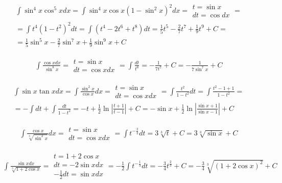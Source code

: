 
\begin{gather*}\int \sin^4 x \cos^5 x dx = \int \sin^4x \cos x(1-\sin^2 x)^2dx = \begin{array}{|l|} t=\sin x \\ dt=\cos dx \end{array} =  \\
= \int t^4(1-t^2)^2dt = \int (t^4-2t^6+t^8)dt = \frac{1}{5}t^5-\frac{2}{7}t^7+\frac{1}{9}t^9+C =  \\
= \frac{1}{5}\sin^5x-\frac{2}{7}\sin^7x+\frac{1}{9}\sin^9x+C\end{gather*}



\begin{gather*}\int \frac{\cos x dx}{\sin^8 x} = \begin{array}{|l|} t=\sin x \\ dt=\cos x dx \end{array} = \int \frac{dt}{t^8} = -\frac{1}{7t^7}+C = -\frac{1}{7\sin^7x}+C\end{gather*}



\begin{gather*}\int \sin x \tan x dx = \int \frac{\sin^2 x}{\cos x}dx = \begin{array}{|l|} t=\sin x \\ dt=\cos x dx \end{array} = \int \frac{t^2}{1-t^2}dt = \int \frac{t^2-1+1}{1-t^2} =  \\
= -\int dt + \int \frac{dt}{1-t^2} = -t + \frac{1}{2}\ln\left|\frac{t+1}{t-1}\right|+C = -\sin x + \frac{1}{2}\ln\left|\frac{\sin x+1}{\sin x-1}\right|+C\end{gather*}



\begin{gather*}\int \frac{\cos x}{\sqrt[3]{\sin^2 x}}dx = \begin{array}{|l|} t=\sin x \\ dt=\cos x dx \end{array} = \int t^{-\frac{2}{3}}dt = 3\sqrt[3]{t}+C = 3\sqrt[3]{\sin x}+C\end{gather*}



\begin{gather*}\int \frac{\sin x dx}{\sqrt[3]{1+2\cos x}} = \begin{array}{|l|} t=1+2\cos x \\ dt=-2\sin x dx \\ -\frac{1}{2}dt=\sin x dx \end{array} = -\frac{1}{2}\int t^{-\frac{1}{3}}dt = -\frac{3}{4}t^{\frac{2}{3}}+C = -\frac{3}{4}\sqrt[3]{(1+2\cos x)^2}+C \end{gather*}


